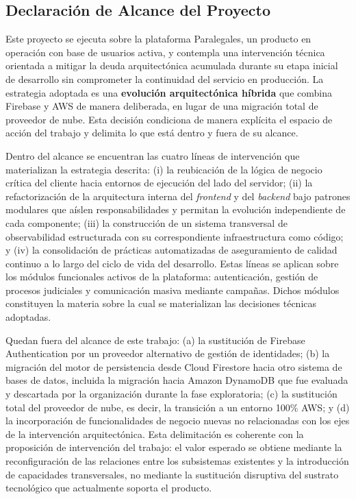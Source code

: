 \subsection{Declaración de Alcance del Proyecto}

Este proyecto se ejecuta sobre la plataforma Paralegales, un producto en operación con base de usuarios activa, y contempla una intervención técnica orientada a mitigar la deuda arquitectónica acumulada durante su etapa inicial de desarrollo sin comprometer la continuidad del servicio en producción. La estrategia adoptada es una \textbf{evolución arquitectónica híbrida} que combina Firebase y AWS de manera deliberada, en lugar de una migración total de proveedor de nube. Esta decisión condiciona de manera explícita el espacio de acción del trabajo y delimita lo que está dentro y fuera de su alcance.

Dentro del alcance se encuentran las cuatro líneas de intervención que materializan la estrategia descrita: (i) la reubicación de la lógica de negocio crítica del cliente hacia entornos de ejecución del lado del servidor; (ii) la refactorización de la arquitectura interna del \textit{frontend} y del \textit{backend} bajo patrones modulares que aíslen responsabilidades y permitan la evolución independiente de cada componente; (iii) la construcción de un sistema transversal de observabilidad estructurada con su correspondiente infraestructura como código; y (iv) la consolidación de prácticas automatizadas de aseguramiento de calidad continuo a lo largo del ciclo de vida del desarrollo. Estas líneas se aplican sobre los módulos funcionales activos de la plataforma: autenticación, gestión de procesos judiciales y comunicación masiva mediante campañas. Dichos módulos constituyen la materia sobre la cual se materializan las decisiones técnicas adoptadas.

Quedan fuera del alcance de este trabajo: (a) la sustitución de Firebase Authentication por un proveedor alternativo de gestión de identidades; (b) la migración del motor de persistencia desde Cloud Firestore hacia otro sistema de bases de datos, incluida la migración hacia Amazon DynamoDB que fue evaluada y descartada por la organización durante la fase exploratoria; (c) la sustitución total del proveedor de nube, es decir, la transición a un entorno 100\% AWS; y (d) la incorporación de funcionalidades de negocio nuevas no relacionadas con los ejes de la intervención arquitectónica. Esta delimitación es coherente con la proposición de intervención del trabajo: el valor esperado se obtiene mediante la reconfiguración de las relaciones entre los subsistemas existentes y la introducción de capacidades transversales, no mediante la sustitución disruptiva del sustrato tecnológico que actualmente soporta el producto.

